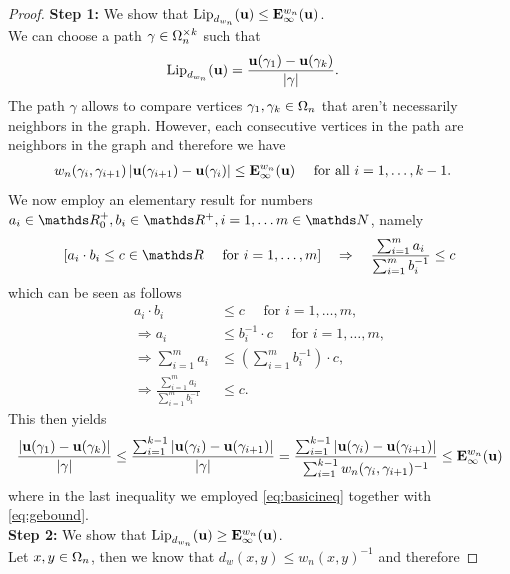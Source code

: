 \begin{proof}
\textbf{Step 1:} We show that $\operatorname{Lip}_{d_{w_n}}(\mathbf{u}) \leq \mathbf{E}_\infty^{w_n}(\mathbf{u})$.\\
%
We can choose a path $\gamma\in\Omega_n^{\times k}$ such that
%
\begin{align*}
\operatorname{Lip}_{d_{w_n}}(\mathbf{u}) &= \frac{\mathbf{u}(\gamma_1) - \mathbf{u}(\gamma_k)}{\left|\gamma\right|}.
\end{align*}
%
The path $\gamma$ allows to compare vertices $\gamma_1, \gamma_k\in\Omega_n$ that aren't necessarily neighbors in the graph. However, each consecutive vertices in the path are neighbors in the graph and therefore we have
%
\begin{align}\label{eq:gebound}
w_n(\gamma_i, \gamma_{i+1}) \left|\mathbf{u}(\gamma_{i+1}) - \mathbf{u}(\gamma_i)\right|
&\leq \mathbf{E}^{w_n}_\infty(\mathbf{u})\quad \text{ for all } i=1,\ldots, k-1.
\end{align} 
%
We now employ an elementary result for numbers $a_i\in\R^+_0, b_i\in\R^+, i=1,\ldots m\in\N$, namely
%
\begin{align}\label{eq:basicineq}
\left[
a_i\cdot b_i \leq c\in\R \quad\text{ for }
i=1,\ldots, m
\right]
%
\quad\Rightarrow\quad
%
\frac{\sum_{i=1}^{m}a_i}{\sum_{i=1}^{m} b_i^{-1}} \leq c
\end{align}
%
which can be seen as follows
%
\begin{align*}
a_i\cdot b_i &\leq c\quad\text{ for } i=1,\ldots, m,\\
\Rightarrow
a_i &\leq b_i^{-1}\cdot c \quad\text{ for } i=1,\ldots, m,\\
\Rightarrow\sum_{i=1}^{m} a_i &\leq \left(\sum_{i=1}^m b_i^{-1}\right)\cdot c,\\
%
\Rightarrow\frac{\sum_{i=1}^{m} a_i}{\sum_{i=1}^{m} b_i^{-1}} &\leq c.
\end{align*}
%
This then yields 
%
\begin{align*}
\frac{\abs{\vec u(\gamma_1) - \vec u(\gamma_k)}}{\abs{\gamma}}\leq
\frac{\sum_{i=1}^{k-1} \abs{\vec u(\gamma_i) - \vec u(\gamma_{i+1})}}{\abs{\gamma}} = 
\frac{\sum_{i=1}^{k-1} \abs{\vec u(\gamma_i) - \vec u(\gamma_{i+1})}}{\sum_{i=1}^{k-1} w_n(\gamma_i, \gamma_{i+1})^{-1}}
%
\leq
\GE^{w_n}_\infty(\vec u) 
\end{align*}
%
where in the last inequality we employed \cref{eq:basicineq} together with \cref{eq:gebound}.\\
%
\noindent%
\textbf{Step 2:} We show that $\operatorname{Lip}_{d_{w_n}}(\mathbf{u}) \geq\mathbf{E}_\infty^{w_n}(\mathbf{u})$.\\
%
Let $x,y\in \Omega_n$, then we know that $d_w(x,y) \leq w_n(x,y)^{-1}$ and therefore

\end{proof}
